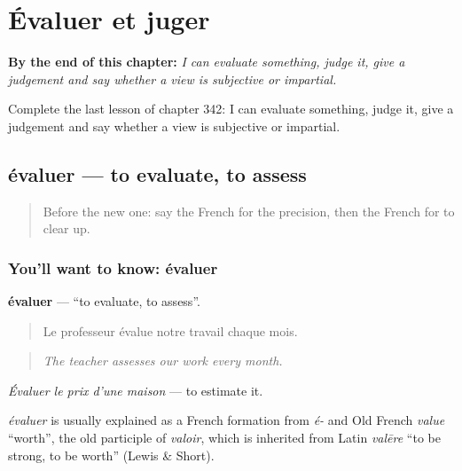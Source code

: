 
\chapter{Évaluer et juger}
\label{ch:fr-evaluer-et-juger}

\begin{chapteropening}
\textbf{By the end of this chapter:} \emph{I can evaluate something, judge it, give a judgement and say whether a view is subjective or impartial.}

Complete the last lesson of chapter 342: I can evaluate something, judge it, give a judgement and say whether a view is subjective or impartial.
\end{chapteropening}

\section[évaluer]{évaluer — to evaluate, to assess}

\label{lesson:FR-C342-evaluer}



\begin{quote}
Before the new one: say the French for the precision, then the French for to clear up.
\end{quote}

\subsection*{You'll want to know: évaluer}
\textbf{évaluer} — \textquotedblleft{}to evaluate, to assess\textquotedblright{}.

\begin{quote}
Le professeur évalue notre travail chaque mois.
\end{quote}

\begin{quote}
\emph{The teacher assesses our work every month.}
\end{quote}

\emph{Évaluer le prix d'une maison} — to estimate it.

\begin{cousinweb}
\emph{évaluer} is usually explained as a French formation from \emph{é-} and Old French \emph{value} \textquotedblleft{}worth\textquotedblright{}, the old participle of \emph{valoir}, which is inherited from Latin \emph{valēre} \textquotedblleft{}to be strong, to be worth\textquotedblright{} (Lewis \& Short).
\end{cousinweb}

